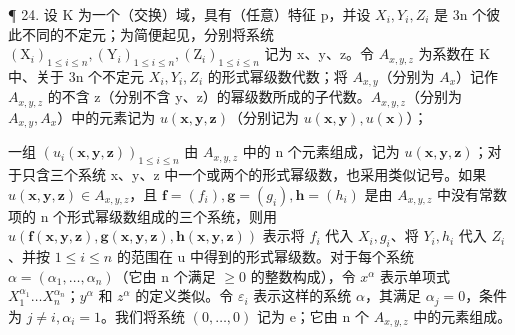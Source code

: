 ¶ 24. 设 K 为一个（交换）域，具有（任意）特征 p，并设 \(X_{i}, Y_{i}, Z_{i}\) 是 3n 个彼此不同的不定元；为简便起见，分别将系统 \((\mathrm{X}_{i})_{1 \leq i \leq n}, (\mathrm{Y}_{i})_{1 \leq i \leq n}, (\mathrm{Z}_{i})_{1 \leq i \leq n}\) 记为 x、y、z。令 \(A_{x,y,z}\) 为系数在 K 中、关于 3n 个不定元 \(X_{i}, Y_{i}, Z_{i}\) 的形式幂级数代数；将 \(A_{x,y}\)（分别为 \(A_{x}\)）记作 \(A_{x,y,z}\) 的不含 z（分别不含 y、z）的幂级数所成的子代数。\(A_{x,y,z}\)（分别为 \(A_{x,y}, A_{x}\)）中的元素记为 \(u(\mathbf{x}, \mathbf{y}, \mathbf{z})\)（分别记为 \(u(\mathbf{x}, \mathbf{y}), u(\mathbf{x})\)）；

  一组 \((u_{i}(\mathbf{x},\mathbf{y},\mathbf{z}))_{1\leqslant i\leqslant n}\) 由 \(A_{x,y,z}\) 中的 n 个元素组成，记为 \(u(\mathbf{x},\mathbf{y},\mathbf{z})\)；对于只含三个系统 x、y、z 中一个或两个的形式幂级数，也采用类似记号。如果 \(u(\mathbf{x},\mathbf{y},\mathbf{z})\in A_{x,y,z}\)，且 \(\mathbf{f}=(f_{i}),\mathbf{g}=(g_{i}),\mathbf{h}=(h_{i})\) 是由 \(A_{x,y,z}\) 中没有常数项的 n 个形式幂级数组成的三个系统，则用 \(u(\mathbf{f}(\mathbf{x},\mathbf{y},\mathbf{z}),\mathbf{g}(\mathbf{x},\mathbf{y},\mathbf{z}),\mathbf{h}(\mathbf{x},\mathbf{y},\mathbf{z}))\) 表示将 \(f_{i}\) 代入 \(X_{i}, g_{i}\)、将 \(Y_{i}, h_{i}\) 代入 \(Z_{i}\)、并按 \(1\leqslant i\leqslant n\) 的范围在 u 中得到的形式幂级数。对于每个系统 \(\alpha=(\alpha_{1},\ldots,\alpha_{n})\)（它由 n 个满足 \(\geqslant0\) 的整数构成），令 \(x^{\alpha}\) 表示单项式 \(X_{1}^{\alpha_{1}}\ldots X_{n}^{\alpha_{n}}\)；\(y^{\alpha}\) 和 \(z^{\alpha}\) 的定义类似。令 \(\varepsilon_{i}\) 表示这样的系统 \(\alpha\)，其满足 \(\alpha_{j}=0\)，条件为 \(j\neq i, \alpha_{i}=1\)。我们将系统 \((0,\ldots,0)\) 记为 e；它由 n 个 \(A_{x,y,z}\) 中的元素组成。

